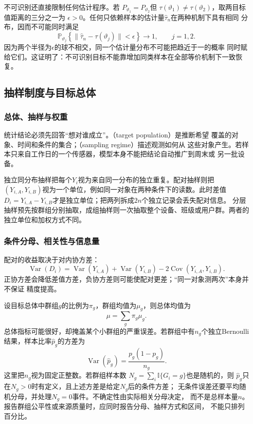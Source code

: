 不可识别还直接限制任何估计程序。若
\(P_{\vartheta_1}=P_{\vartheta_2}\)但
\(\tau(\vartheta_1)\neq\tau(\vartheta_2)\)，取两目标值距离的三分之一为
\(\epsilon>0\)。任何只依赖样本的估计量\(\widehat\tau_n\)在两种机制下具有相同
分布，因而不可能同时满足
\[
  \mathbb{P}_{\vartheta_j}
  \left\{\lVert\widehat\tau_n-\tau(\vartheta_j)\rVert<\epsilon\right\}
  \longrightarrow1,\qquad j=1,2.
\]
因为两个半径为\(\epsilon\)的球不相交，同一个估计量分布不可能把趋近于一的概率
同时赋给它们。这证明了：不可识别目标不能靠增加同类样本在全部等价机制下一致恢复。

\subsection{抽样制度与目标总体}
\label{sec:statistics-sampling-population}

\subsubsection{总体、抽样与权重}

统计结论必须先回答“想对谁成立”。（target population）是推断希望
覆盖的对象、时间和条件的集合；（sampling regime）描述观测如何从
这些对象产生。若样本只来自工作日的一个传感器，模型本身不能把结论自动推广到周末或
另一批设备。

独立同分布抽样把每个\(Y_i\)视为来自同一分布的独立重复。配对抽样则把
\((Y_{i,A},Y_{i,B})\)视为一个单位，例如同一对象在两种条件下的读数。此时差值
\(D_i=Y_{i,A}-Y_{i,B}\)才是独立单位；把两列拆成\(2n\)个独立记录会丢失配对信息。
分层抽样预先按群组分别抽取，成组抽样则一次抽取整个设备、班级或用户群。两者的
独立单位和加权方式不同。

\subsubsection{条件分母、相关性与信息量}

配对的收益取决于对内协方差：
\[
  \operatorname{Var}(D_i)
  =\operatorname{Var}(Y_{i,A})+\operatorname{Var}(Y_{i,B})
   -2\operatorname{Cov}(Y_{i,A},Y_{i,B}).
\]
正协方差会降低差值方差，负协方差则可能使配对更差；“同一对象测两次”本身并不保证
精度提高。

设目标总体中群组\(g\)的比例为\(\pi_g\)，群组均值为\(\mu_g\)，则总体均值为
\[
  \mu=\sum_g\pi_g\mu_g.
\]
总体指标可能很好，却掩盖某个小群组的严重误差。若群组中有\(n_g\)个独立Bernoulli
结果，样本比率\(\widehat p_g\)的方差为
\[
  \operatorname{Var}(\widehat p_g)
  =\frac{p_g(1-p_g)}{n_g}.
\]
这里把\(n_g\)视为固定正整数。若群组样本数
\(N_g=\sum_i\mathbb{I}\{G_i=g\}\)也是随机的，则
\(\widehat p_g\)只在\(N_g>0\)时有定义，且上述方差是给定\(N_g\)后的条件方差；
无条件误差还要平均随机分母，并处理\(N_g=0\)事件。不确定性由实际相关分母决定，
而不是总样本量\(n\)。报告群组公平性或来源质量时，应同时报告分母、抽样方式和区间，
不能只排列百分比。


